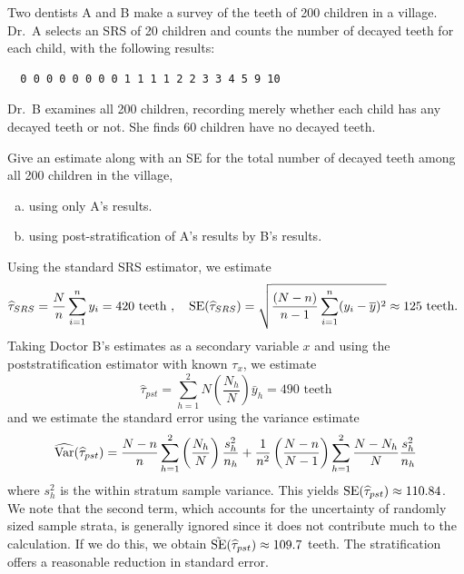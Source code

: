 \documentclass[usenames,dvipsnames]{homework}
\begin{document}
\begin{longproblem} Two dentists A and B make a survey of the teeth of 200 children in a village.  Dr.~A selects an SRS of 20 children and counts the number of decayed teeth for each child, with the following results:
\begin{verbatim}
  0 0 0 0 0 0 0 0 1 1 1 1 2 2 3 3 4 5 9 10
\end{verbatim}
Dr.~B examines all 200 children, recording merely whether each child has any decayed teeth or not.  She finds 60 children have no decayed teeth.  

Give an estimate along with an SE for the total number of decayed teeth among all 200 children in the village,
\begin{enumerate}[(a)]
  \item using only A's results.
  \item using post-stratification of A's results by B's results.
\end{enumerate}

\begin{solution}
  Using the standard SRS estimator, we estimate
$$
\widehat\tau_{SRS} = \frac Nn \sum_{i=1}^n y_i = 420\text{ teeth } ,\quad \mathrm{SE}(\widehat\tau_{SRS}) = \sqrt{\frac{(N-n)}{n-1}\sum_{i=1}^n (y_i - \overline y)^2} \approx 125\text{ teeth. }
$$
Taking Doctor B's estimates as a secondary variable $x$ and using the poststratification estimator with known $\tau_x$, we estimate
$$
  \hat \tau_{pst} = \sum_{h=1}^2 N \left(\frac{N_h}{N}\right) \bar y_h = 490\text{ teeth}
$$
and we estimate the standard error using the variance estimate
$$
  \widehat{\mathrm{Var}}(\widehat \tau_{pst}) = \frac{N-n}n \sum_{h=1}^2 \left(\frac{N_h}{N} \right) \frac{s_h^2}{n_h} + \frac 1{n^2}\left(\frac{N-n}{N-1}\right) \sum_{h=1}^2 \frac{N-N_h}{N} \frac{s_h^2}{n_h}
$$
where $s_h^2$ is the within stratum sample variance.  This yields $\mathrm{SE}(\widehat\tau_{pst}) \approx 110.84$.  We note that the second term, which accounts for the uncertainty of randomly sized sample strata, is generally ignored since it does not contribute much to the calculation.  If we do this, we obtain $\tilde{\mathrm{SE}}(\widehat\tau_{pst}) \approx 109.7$ teeth.  The stratification offers a reasonable reduction in standard error.

\end{solution}
\end{longproblem}
\vspace{-2em}
\end{document}
